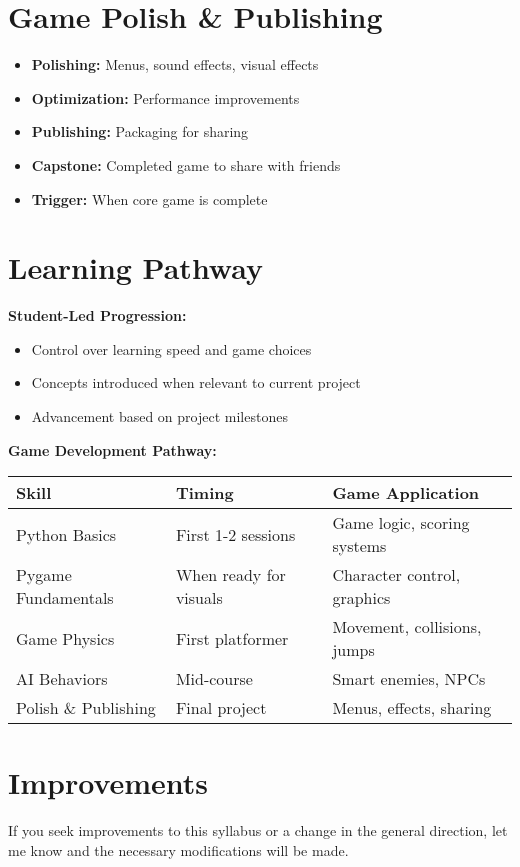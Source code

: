 \documentclass{article}
\begin{document}
\section{Game Polish \& Publishing}
\begin{itemize}[nosep]
    \item \textbf{Polishing:} Menus, sound effects, visual effects
    \item \textbf{Optimization:} Performance improvements
    \item \textbf{Publishing:} Packaging for sharing
    \item \textbf{Capstone:} Completed game to share with friends
    \item \textbf{Trigger:} When core game is complete
\end{itemize}

\section{Learning Pathway}

\begin{learningblock}
\textbf{Student-Led Progression:}
\begin{itemize}[nosep]
    \item Control over learning speed and game choices
    \item Concepts introduced when relevant to current project
    \item Advancement based on project milestones
\end{itemize}

\textbf{Game Development Pathway:}
\begin{center}
\small
\begin{tabular}{p{3.5cm} p{3cm} p{6cm}}
\textbf{Skill} & \textbf{Timing} & \textbf{Game Application} \\
\hline
Python Basics & First 1-2 sessions & Game logic, scoring systems \\
\hline
Pygame Fundamentals & When ready for visuals & Character control, graphics \\
\hline
Game Physics & First platformer & Movement, collisions, jumps \\
\hline
AI Behaviors & Mid-course & Smart enemies, NPCs \\
\hline
Polish \& Publishing & Final project & Menus, effects, sharing \\
\end{tabular}
\end{center}
\end{learningblock}

\section{Improvements}
If you seek improvements to this syllabus or a change in the general direction, let me know and the necessary modifications will be made.
\end{document}
